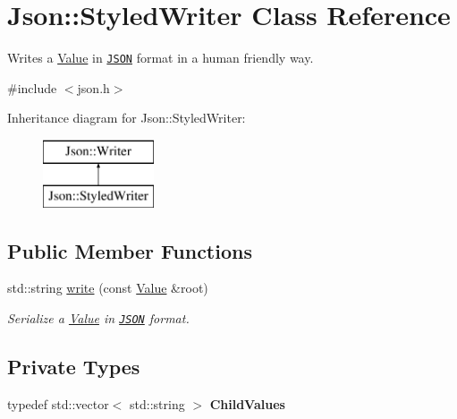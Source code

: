 \hypertarget{class_json_1_1_styled_writer}{}\section{Json\+:\+:Styled\+Writer Class Reference}
\label{class_json_1_1_styled_writer}


Writes a \hyperlink{class_json_1_1_value}{Value} in \href{http://www.json.org}{\tt J\+S\+O\+N} format in a human friendly way.  




{\ttfamily \#include $<$json.\+h$>$}

Inheritance diagram for Json\+:\+:Styled\+Writer\+:\begin{figure}[H]
\begin{center}
\leavevmode
\includegraphics[height=2.000000cm]{class_json_1_1_styled_writer}
\end{center}
\end{figure}
\subsection*{Public Member Functions}
\begin{DoxyCompactItemize}
\item 
std\+::string \hyperlink{class_json_1_1_styled_writer_a56f0fd80f60272b3f3c85690aae66e7d}{write} (const \hyperlink{class_json_1_1_value}{Value} \&root)
\begin{DoxyCompactList}\small\item\em Serialize a \hyperlink{class_json_1_1_value}{Value} in \href{http://www.json.org}{\tt J\+S\+O\+N} format. \end{DoxyCompactList}\end{DoxyCompactItemize}
\subsection*{Private Types}
\begin{DoxyCompactItemize}
\item 
\hypertarget{class_json_1_1_styled_writer_a0b102abcd4b7e11eb22df63921e097df}{}typedef std\+::vector$<$ std\+::string $>$ {\bfseries Child\+Values}\label{class_json_1_1_styled_writer_a0b102abcd4b7e11eb22df63921e097df}

\end{DoxyCompactItemize}
